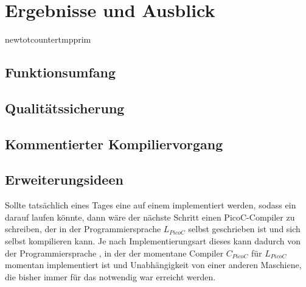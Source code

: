 \chapter{Ergebnisse und Ausblick}
\label{ch:ergebnisse_und_ausblick}

\setcounter{defcounter}{1}

newtotcounter{tmpprim}

\section{Funktionsumfang}
\section{Qualitätssicherung}
\label{sec:qualitätssicherung}
\section{Kommentierter Kompiliervorgang}
\section{Erweiterungsideen}
Sollte tatsächlich eines Tages eine  auf einem  implementiert werden, sodass ein  darauf laufen könnte, dann wäre der nächste Schritt einen PicoC-Compiler zu schreiben, der in der Programmiersprache $L_{PicoC}$ selbst geschrieben ist und sich selbst kompilieren kann. Je nach Implementierungsart dieses  kann dadurch  von der Programmiersprache , in der der momentane Compiler $C_{PicoC}$ für $L_{PicoC}$ momentan implementiert ist und Unabhängigkeit von einer anderen Maschiene, die bisher immer für das  notwendig war erreicht werden.

